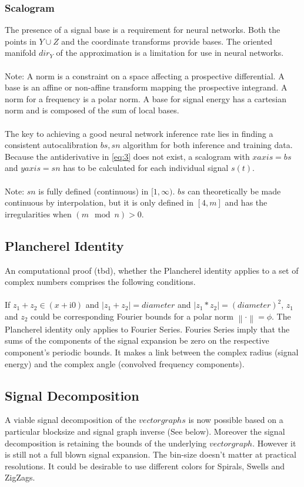 \documentclass{report}
\newcommand\norm[1]{\left\lVert#1\right\rVert}
\begin{document}
\subsubsection{Scalogram}
The presence of a signal base is a requirement for neural networks. Both the points in $Y\cup Z$ and the coordinate transforms provide bases. The oriented manifold $dir_{Y}$ of the approximation is a limitation for use in neural networks.\\\\
Note: A norm is a constraint on a space affecting a prospective differential. A base is an affine or non-affine transform mapping the prospective integrand. A norm for a frequency is a polar norm. A base for signal energy has a cartesian norm and is composed of the sum of local bases.\\\\
The key to achieving a good neural network inference rate lies in finding a consistent autocalibration $bs,sn$ algorithm for both inference and training data. Because the antiderivative in \eqref{eq:3} does not exist, a scalogram with $xaxis=bs$ and $yaxis=sn$ has to be calculated for each individual signal $s(t)$.\\\\
Note: $sn$ is fully defined (continuous) in $[1,\infty)$. $bs$ can theoretically be made continuous by interpolation, but it is only defined in $[4,m]$ and has the irregularities when $(m\mod n) > 0$.

\subsection{Plancherel Identity}
An computational proof (tbd), whether the Plancherel identity applies to a set of complex numbers comprises the following conditions.\\\\
If $z_{1}+z_{2}\in (x+\mathrm{i}0)$ and $\lvert z_{1}+z_{2}\rvert=diameter$ and $\lvert z_{1}*z_{2}\rvert=(diameter)^2$, $z_{1}$ and $z_{2}$ could be corresponding Fourier bounds for a polar norm $\norm{\cdot}=\phi$.
The Plancherel identity only applies to Fourier Series. Fouries Series imply that the sums of the components of the signal expansion be zero on the respective component's periodic bounds. It makes a link between the complex radius (signal energy) and the complex angle (convolved frequency components).
\subsection{Signal Decomposition}
A viable signal decomposition of the $vectorgraphs$ is now possible based on a particular blocksize and signal graph inverse (See below). Moreover the signal decomposition is retaining the bounds of the underlying $vectorgraph$. However it is still not a full blown signal expansion. The bin-size doesn't matter at practical resolutions. It could be desirable to use different colors for Spirals, Swells and ZigZags.
\end{document}
